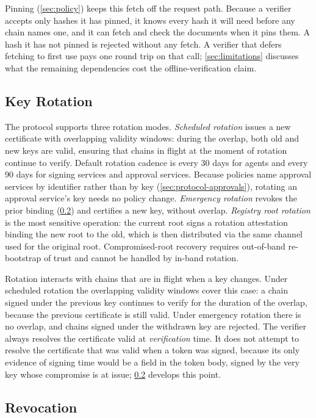 \documentclass[11pt,a4paper]{article}
\begin{document}
Pinning (\cref{sec:policy}) keeps this fetch off the request path.
Because a verifier accepts only hashes it has pinned, it knows every
hash it will need before any chain names one, and it can fetch and check
the documents when it pins them. A hash it has not pinned is rejected
without any fetch. A verifier that defers fetching to first use pays one
round trip on that call; \cref{sec:limitations} discusses what the
remaining dependencies cost the offline-verification claim.

\subsection{Key Rotation}
\label{sec:identity-rotation}

The protocol supports three rotation modes. \emph{Scheduled rotation}
issues a new certificate with overlapping validity windows: during the
overlap, both old and new keys are valid, ensuring that chains in
flight at the moment of rotation continue to verify. Default rotation
cadence is every 30 days for agents and every 90 days for signing
services and approval services. Because policies name approval services
by identifier rather than by key (\cref{sec:protocol-approvals}),
rotating an approval service's key needs no policy change. \emph{Emergency rotation} revokes the
prior binding (\cref{sec:identity-revocation}) and certifies a new key,
without overlap. \emph{Registry root rotation} is the most
sensitive operation: the current root signs a rotation attestation
binding the new root to the old, which is then distributed via the
same channel used for the original root. Compromised-root recovery
requires out-of-band re-bootstrap of trust and cannot be handled by
in-band rotation.

Rotation interacts with chains that are in flight when a key changes.
Under scheduled rotation the overlapping validity windows cover this
case: a chain signed under the previous key continues to verify for the
duration of the overlap, because the previous certificate is still
valid. Under emergency rotation there is no overlap, and chains signed
under the withdrawn key are rejected. The verifier always resolves the
certificate valid at \emph{verification} time. It does not attempt to
resolve the certificate that was valid when a token was signed, because
its only evidence of signing time would be a field in the token body,
signed by the very key whose compromise is at issue;
\cref{sec:identity-revocation} develops this point.

\subsection{Revocation}
\label{sec:identity-revocation}
\end{document}
